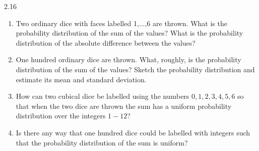\documentclass[12pt, a4paper]{article}
\begin{document}
\begin{prob}{2.16}
    \begin{enumerate}
        \item[(a)]Two ordinary dice with faces labelled 1,...,6 are
thrown. What is the probability distribution of the sum of the values? What is the probability distribution of the absolute difference
between the values?
\item[(b)] One hundred ordinary dice are thrown. What, roughly, is the probability distribution of the sum of the values? Sketch the probability
distribution and estimate its mean and standard deviation.
\item[(c)] How can two cubical dice be labelled using the numbers
${0, 1, 2, 3, 4, 5, 6}$ so that when the two dice are thrown the sum
has a uniform probability distribution over the integers $1 - 12$?
\item[(d)] Is there any way that one hundred dice could be labelled with integers such that the probability distribution of the sum is uniform?
    \end{enumerate}
\end{prob}
\end{document}
